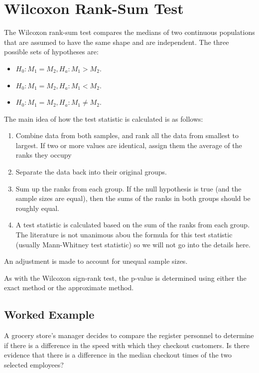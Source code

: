 \documentclass[
]{book}
\providecommand{\tightlist}{%
  \setlength{\itemsep}{0pt}\setlength{\parskip}{0pt}}
\theoremstyle{definition}
\theoremstyle{definition}
\theoremstyle{definition}
\theoremstyle{definition}
\theoremstyle{remark}
\begin{document}
\hypertarget{wilcoxon-rank-sum-test}{%
\section{Wilcoxon Rank-Sum Test}\label{wilcoxon-rank-sum-test}}

The Wilcoxon rank-sum test compares the medians of two continuous populations that are assumed to have the same shape and are independent. The three possible sets of hypotheses are:

\begin{itemize}
\tightlist
\item
  \(H_0: M_1 = M_2, H_a: M_1 > M_2\).
\item
  \(H_0: M_1 = M_2, H_a: M_1 < M_2\).
\item
  \(H_0: M_1 = M_2, H_a: M_1 \neq M_2\).
\end{itemize}

The main idea of how the test statistic is calculated is as follows:

\begin{enumerate}
\def\labelenumi{\arabic{enumi}.}
\item
  Combine data from both samples, and rank all the data from smallest to largest. If two or more values are identical, assign them the average of the ranks they occupy
\item
  Separate the data back into their original groups.
\item
  Sum up the ranks from each group. If the null hypothesis is true (and the sample sizes are equal), then the sums of the ranks in both groups should be roughly equal.
\item
  A test statistic is calculated based on the sum of the ranks from each group. The literature is not unanimous abou the formula for this test statistic (usually Mann-Whitney test statistic) so we will not go into the details here.
\end{enumerate}

An adjustment is made to account for unequal sample sizes.

As with the Wilcoxon sign-rank test, the p-value is determined using either the exact method or the approximate method.

\hypertarget{worked-example-6}{%
\subsection{Worked Example}\label{worked-example-6}}

A grocery store's manager decides to compare the register personnel to determine if there is a difference in the speed with which they checkout customers. Is there evidence that there is a difference in the median checkout times of the two selected employees?
\end{document}
